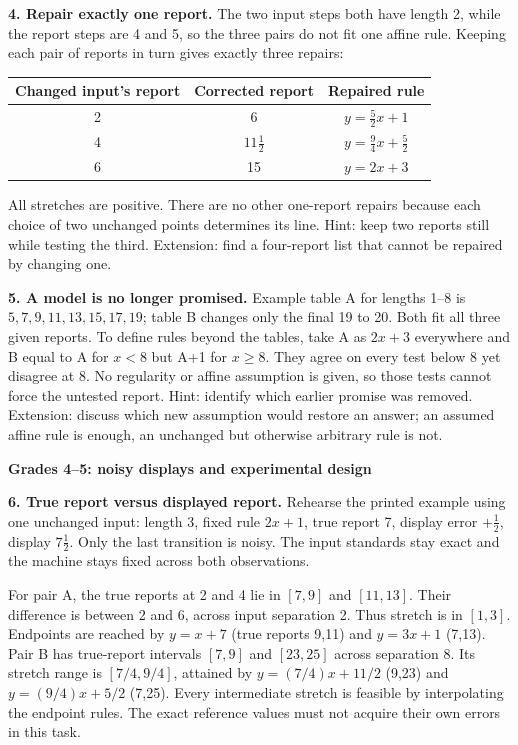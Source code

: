 \documentclass[letterpaper,11pt]{article}
\newcommand{\topic}[1]{\par\medskip\textbf{#1}\par}
\begin{document}
\textbf{4. Repair exactly one report.} The two input steps both have length 2, while the report steps are 4 and 5, so the three pairs do not fit one affine rule. Keeping each pair of reports in turn gives exactly three repairs:
\begin{center}\begin{tabular}{c|c|c}
Changed input's report & Corrected report & Repaired rule\\\hline
2&6&$y=\tfrac52x+1$\\
4&$11\tfrac12$&$y=\tfrac94x+\tfrac52$\\
6&15&$y=2x+3$
\end{tabular}\end{center}
All stretches are positive. There are no other one-report repairs because each choice of two unchanged points determines its line. Hint: keep two reports still while testing the third. Extension: find a four-report list that cannot be repaired by changing one.

\textbf{5. A model is no longer promised.} Example table A for lengths 1--8 is $5,7,9,11,13,15,17,19$; table B changes only the final 19 to 20. Both fit all three given reports. To define rules beyond the tables, take A as $2x+3$ everywhere and B equal to A for $x<8$ but A+1 for $x\ge8$. They agree on every test below 8 yet disagree at 8. No regularity or affine assumption is given, so those tests cannot force the untested report. Hint: identify which earlier promise was removed. Extension: discuss which new assumption would restore an answer; an assumed affine rule is enough, an unchanged but otherwise arbitrary rule is not.
\newpage
\topic{Grades 4--5: noisy displays and experimental design}
\textbf{6. True report versus displayed report.} Rehearse the printed example using one unchanged input: length 3, fixed rule $2x+1$, true report 7, display error $+\tfrac12$, display $7\tfrac12$. Only the last transition is noisy. The input standards stay exact and the machine stays fixed across both observations.

For pair A, the true reports at 2 and 4 lie in $[7,9]$ and $[11,13]$. Their difference is between 2 and 6, across input separation 2. Thus stretch is in $[1,3]$. Endpoints are reached by $y=x+7$ (true reports 9,11) and $y=3x+1$ (7,13). Pair B has true-report intervals $[7,9]$ and $[23,25]$ across separation 8. Its stretch range is $[7/4,9/4]$, attained by $y=(7/4)x+11/2$ (9,23) and $y=(9/4)x+5/2$ (7,25). Every intermediate stretch is feasible by interpolating the endpoint rules. The exact reference values must not acquire their own errors in this task.
\end{document}
